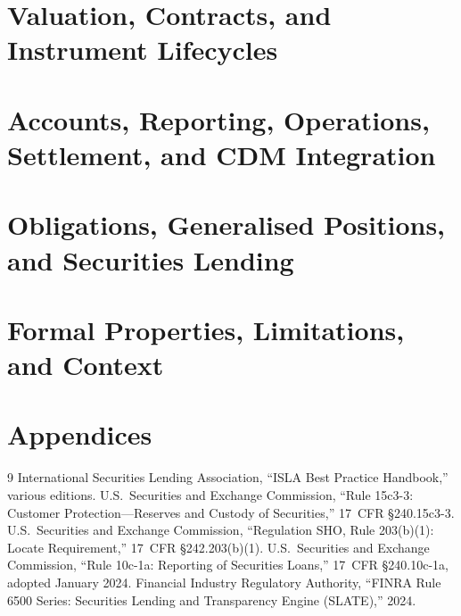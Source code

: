 \documentclass[11pt,a4paper]{article}
\begin{document}
\part{Valuation, Contracts, and Instrument Lifecycles}





\part{Accounts, Reporting, Operations, Settlement, and CDM Integration}





\part{Obligations, Generalised Positions, and Securities Lending}


\part{Formal Properties, Limitations, and Context}





\appendix
\part{Appendices}









\begin{thebibliography}{9}
 International Securities Lending Association, ``ISLA Best Practice Handbook,'' various editions.
 U.S.\ Securities and Exchange Commission, ``Rule 15c3-3: Customer Protection---Reserves and Custody of Securities,'' 17~CFR \S240.15c3-3.
 U.S.\ Securities and Exchange Commission, ``Regulation SHO, Rule 203(b)(1): Locate Requirement,'' 17~CFR \S242.203(b)(1).
 U.S.\ Securities and Exchange Commission, ``Rule 10c-1a: Reporting of Securities Loans,'' 17~CFR \S240.10c-1a, adopted January 2024.
 Financial Industry Regulatory Authority, ``FINRA Rule 6500 Series: Securities Lending and Transparency Engine (SLATE),'' 2024.
\end{thebibliography}
\end{document}
